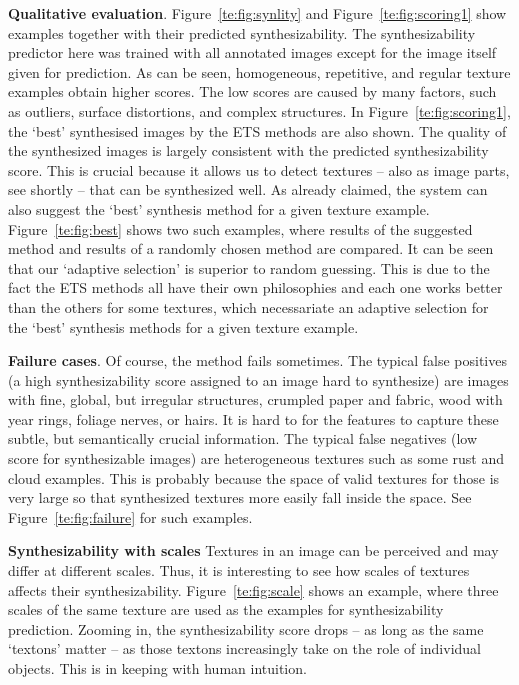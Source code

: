 \textbf{Qualitative evaluation}. 
Figure~\ref{te:fig:synlity} and
Figure~\ref{te:fig:scoring1} show examples together with their predicted
synthesizability. The synthesizability predictor here was trained
with all annotated images except for the image itself given for prediction.
As can be seen, homogeneous, repetitive, and regular texture examples
obtain higher scores. The low scores are caused by many factors, such
as outliers, surface distortions, and complex structures. In
Figure~\ref{te:fig:scoring1}, the `best' synthesised images by the ETS
methods are also shown.  The quality of the synthesized images is
largely consistent with the predicted synthesizability score. This is
crucial because it allows us to detect textures -- also as image
parts, see shortly -- that can be synthesized well.  As already
claimed, the system can also suggest the `best' synthesis method for a
given texture example. Figure~\ref{te:fig:best} shows two such examples,
where results of the suggested method and results of a randomly chosen
method are compared.  It can be seen that our `adaptive selection' is
superior to random guessing. This is due to the fact the ETS methods
all have their own philosophies and each one works better than the
others for some textures, which necessariate an adaptive
selection for the `best' synthesis methods for a given texture example.



\textbf{Failure cases}. Of course, the method fails sometimes.  The
typical false positives (a high synthesizability score assigned to an
image hard to synthesize) are images with fine, global, but irregular
structures, \eg crumpled paper and fabric, wood with year rings,
foliage nerves, or hairs.  It is hard to for the features to capture
these subtle, but semantically crucial information. The typical false
negatives (low score for synthesizable images) are heterogeneous
textures such as some rust and cloud examples.  This is probably
because the space of valid textures for those is very large so that
synthesized textures more easily fall inside the space. See
Figure~\ref{te:fig:failure} for such examples.

\textbf{Synthesizability with scales} Textures in an image can be
perceived and may differ at different scales. Thus, it is interesting
to see how scales of textures affects their
synthesizability. Figure~\ref{te:fig:scale} shows an example, where three
scales of the same texture are used as the examples for
synthesizability prediction. Zooming in, the synthesizability score
drops -- as long as the same `textons' matter -- as those textons 
increasingly take on the role of individual objects. This is in keeping with
human intuition. 




